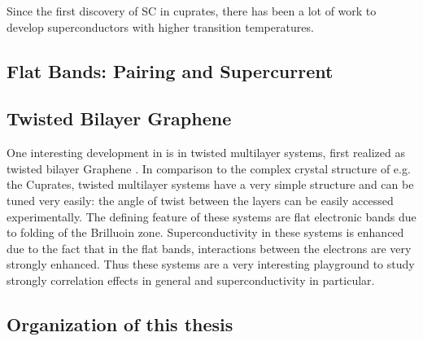 \documentclass[../notes.tex]{subfiles}
\begin{document}
Since the first discovery of SC in cuprates, there has been a lot of work to develop superconductors with higher transition temperatures.

\subsection*{Flat Bands: Pairing and Supercurrent}

\subsection*{Twisted Bilayer Graphene}

One interesting development in is in twisted multilayer systems, first realized as twisted bilayer Graphene \cite{caoUnconventionalSuperconductivityMagicangle2018}.
In comparison to the complex crystal structure of e.g. the Cuprates, twisted multilayer systems have a very simple structure and can be tuned very easily: the angle of twist between the layers can be easily accessed experimentally.
The defining feature of these systems are flat electronic bands due to folding of the Brilluoin zone.
Superconductivity in these systems is enhanced due to the fact that in the flat bands, interactions between the electrons are very strongly enhanced.
Thus these systems are a very interesting playground to study strongly correlation effects in general and superconductivity in particular.


\subsection*{Organization of this thesis}
\end{document}
